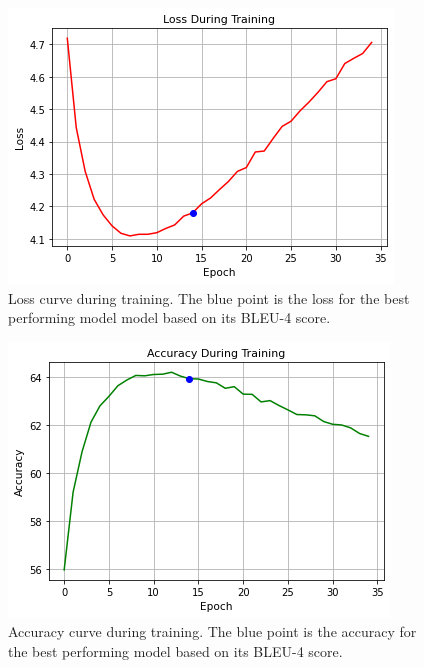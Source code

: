 \documentclass[11pt,a4paper]{article}
\begin{document}
\begin{figure}[ht]
  \includegraphics[width=\linewidth]{paper/images/loss_graph.png}
  \caption{Loss curve during training. The blue point is the loss for the best performing model model based on its BLEU-4 score.}
  \label{fig:lossgraph}
\end{figure}

\begin{figure}[ht]
  \includegraphics[width=\linewidth]{paper/images/accuracy_graph.png}
  \caption{Accuracy curve during training. The blue point is the accuracy for the best performing model based on its BLEU-4 score.}
  \label{fig:accuracygraph}
\end{figure}
\end{document}
